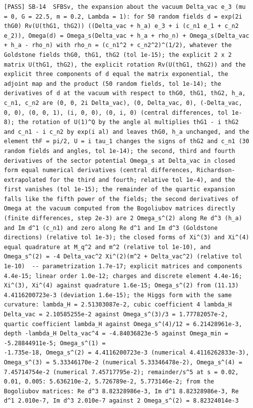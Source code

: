 \documentclass[
  10pt,
]{article}
\begin{document}
\begin{verbatim}
[PASS] SB-14  SFBSv, the expansion about the vacuum Delta_vac e_3 (mu = 0, G = 22.5, m = 0.2, Lambda = 1): for 50 random fields d = exp(2i thG0) Rv(U(thG1, thG2)) ((Delta_vac + h_a) e_3 + i (c_n1 e_1 + c_n2 e_2)), Omega(d) = Omega_s(Delta_vac + h_a + rho_n) + Omega_s(Delta_vac + h_a - rho_n) with rho_n = (c_n1^2 + c_n2^2)^(1/2), whatever the Goldstone fields thG0, thG1, thG2 (tol 1e-15); the explicit 2 x 2 matrix U(thG1, thG2), the explicit rotation Rv(U(thG1, thG2)) and the explicit three components of d equal the matrix exponential, the adjoint map and the product (50 random fields, tol 1e-14); the derivatives of d at the vacuum with respect to thG0, thG1, thG2, h_a, c_n1, c_n2 are (0, 0, 2i Delta_vac), (0, Delta_vac, 0), (-Delta_vac, 0, 0), (0, 0, 1), (i, 0, 0), (0, i, 0) (central differences, tol 1e-8); the rotation of U(1)^Q by the angle al multiplies thG1 - i thG2 and c_n1 - i c_n2 by exp(i al) and leaves thG0, h_a unchanged, and the element thF = pi/2, U = i tau_1 changes the signs of thG2 and c_n1 (30 random fields and angles, tol 1e-14); the second, third and fourth derivatives of the sector potential Omega_s at Delta_vac in closed form equal numerical derivatives (central differences, Richardson-extrapolated for the third and fourth; relative tol 1e-4), and the first vanishes (tol 1e-15); the remainder of the quartic expansion falls like the fifth power of the fields; the second derivatives of Omega at the vacuum computed from the Bogoliubov matrices directly (finite differences, step 2e-3) are 2 Omega_s^(2) along Re d^3 (h_a) and Im d^1 (c_n1) and zero along Re d^1 and Im d^3 (Goldstone directions) (relative tol 1e-3); the closed forms of Xi^(3) and Xi^(4) equal quadrature at M_q^2 and m^2 (relative tol 1e-10), and Omega_s^(2) = -4 Delta_vac^2 Xi^(2)(m^2 + Delta_vac^2) (relative tol 1e-10)  -- parametrization 1.7e-17; explicit matrices and components 4.4e-15; linear order 1.0e-12; charges and discrete element 4.4e-16; Xi^(3), Xi^(4) against quadrature 1.6e-15; Omega_s^(2) from (11.13) 4.4116200723e-3 (deviation 1.6e-15); the Higgs form with the same curvature: lambda_H = 2.51303087e-2, cubic coefficient 4 lambda_H Delta_vac = 2.10585255e-2 against Omega_s^(3)/3 = 1.77782057e-2, quartic coefficient lambda_H against Omega_s^(4)/12 = 6.21428961e-3, depth -lambda_H Delta_vac^4 = -4.84036823e-5 against Omega_min = -5.28844911e-5; Omega_s^(1) =
-1.735e-18, Omega_s^(2) = 4.4116200723e-3 (numerical 4.4116262833e-3), Omega_s^(3) = 5.33346170e-2 (numerical 5.33346478e-2), Omega_s^(4) = 7.45714754e-2 (numerical 7.45717795e-2); remainder/s^5 at s = 0.02, 0.01, 0.005: 5.636210e-2, 5.726789e-2, 5.773146e-2; from the Bogoliubov matrices: Re d^3 8.82328986e-3, Im d^1 8.82328986e-3, Re d^1 2.010e-7, Im d^3 2.010e-7 against 2 Omega_s^(2) = 8.82324014e-3

\end{verbatim}
\end{document}
